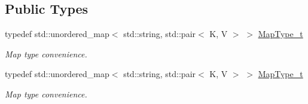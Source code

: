 \subsection*{Public Types}
\begin{DoxyCompactItemize}
\item 
typedef std\+::unordered\+\_\+map$<$ std\+::string, std\+::pair$<$ K, V $>$ $>$ \mbox{\hyperlink{classADAT_1_1MapObjectIterator_ad159a70384669e35c10ddb298c4d1ba8}{Map\+Type\+\_\+t}}
\begin{DoxyCompactList}\small\item\em Map type convenience. \end{DoxyCompactList}\item 
typedef std\+::unordered\+\_\+map$<$ std\+::string, std\+::pair$<$ K, V $>$ $>$ \mbox{\hyperlink{classADAT_1_1MapObjectIterator_ad159a70384669e35c10ddb298c4d1ba8}{Map\+Type\+\_\+t}}
\begin{DoxyCompactList}\small\item\em Map type convenience. \end{DoxyCompactList}\end{DoxyCompactItemize}
